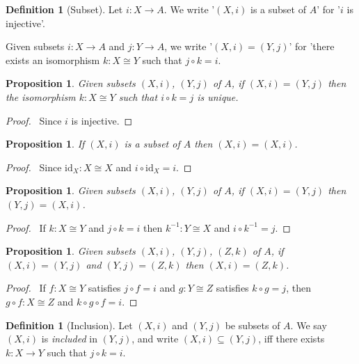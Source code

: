 \documentclass{book}
\let\qed\relax
\newtheorem{prop}[ax]{Proposition}
\theoremstyle{definition}
\newtheorem{df}[ax]{Definition}
\newcommand{\id}[1]{\ensuremath{\mathrm{id}_{#1}}}
\newcommand{\inv}[1]{\ensuremath{{#1}^{-1}}}
\begin{document}
\begin{df}[Subset]
Let $i : X \rightarrow A$. We write '$(X,i)$ is a subset of $A$' for '$i$ is injective'.

Given subsets $i : X \rightarrow A$ and $j : Y \rightarrow A$,
we write '$(X,i) = (Y,j)$' for 'there exists an isomorphism $k : X \cong Y$ such that $j \circ k = i$.
\end{df}

\begin{prop}
Given subsets $(X,i)$, $(Y,j)$ of $A$, if $(X,i) = (Y,j)$ then the isomorphism $k : X \cong Y$ such that $i \circ k = j$ is unique.
\end{prop}

\begin{proof}
\pf\ Since $i$ is injective. \qed
\end{proof}

\begin{prop}
If $(X,i)$ is a subset of $A$ then $(X,i) = (X,i)$.
\end{prop}

\begin{proof}
\pf\ Since $\id{X} : X \cong X$ and $i \circ \id{X} = i$. \qed
\end{proof}

\begin{prop}
Given subsets $(X,i)$, $(Y,j)$ of $A$, if $(X,i) = (Y,j)$ then $(Y,j) = (X,i)$.
\end{prop}

\begin{proof}
\pf\ If $k : X \cong Y$ and $j \circ k = i$ then $\inv{k} : Y \cong X$ and $i \circ \inv{k} = j$. \qed
\end{proof}

\begin{prop}
Given subsets $(X,i)$, $(Y,j)$, $(Z,k)$ of $A$, if $(X,i) = (Y,j)$ and $(Y,j) = (Z,k)$ then $(X,i) = (Z,k)$.
\end{prop}

\begin{proof}
\pf\ If $f : X \cong Y$ satisfies $j \circ f = i$ and $g : Y \cong Z$ satisfies $k \circ g = j$, then $g \circ f : X \cong Z$ and $k \circ g \circ f = i$. \qed
\end{proof}

\begin{df}[Inclusion]
Let $(X,i)$ and $(Y,j)$ be subsets of $A$. We say $(X,i)$ is \emph{included} in $(Y,j)$, and write $(X,i) \subseteq (Y,j)$, iff there exists $k : X \rightarrow Y$ such that $j \circ k = i$.
\end{df}
\end{document}
